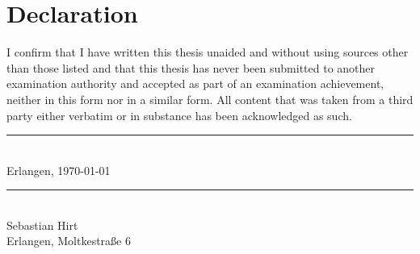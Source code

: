 \chapter*{Declaration}
\thispagestyle{empty}

\noindent
I confirm that I have written this thesis unaided and without using sources other than those listed and that this thesis has never been submitted to another examination authority and accepted as part of an examination achievement, neither in this form nor in a similar form.
All content that was taken from a third party either verbatim or in substance has been acknowledged as such.

\vspace{3cm}

\begin{minipage}[t]{0.45\textwidth}
    \rule{\textwidth}{0.5pt}\\
	Erlangen, \today
\end{minipage}
\hfill
\begin{minipage}[t]{0.45\textwidth}
	\rule{\textwidth}{0.5pt}\\
	Sebastian Hirt\\
    Erlangen, Moltkestraße 6
\end{minipage}
